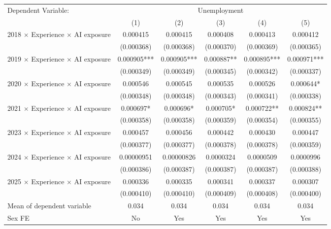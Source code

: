 \def\sym#1{\ifmmode^{#1}\else\(^{#1}\)\fi}
\begin{tabular}{l*{5}{c}}
\toprule
Dependent Variable: & \multicolumn{5}{c}{Unemployment} \\
\cmidrule(lr){2-6}
 & (1) & (2) & (3) & (4) & (5) \\
\midrule
2018 $\times$ Experience $\times$ AI exposure&    0.000415   &    0.000415   &    0.000408   &    0.000413   &    0.000412   \\
            &  (0.000368)   &  (0.000368)   &  (0.000370)   &  (0.000369)   &  (0.000365)   \\
2019 $\times$ Experience $\times$ AI exposure&    0.000905***&    0.000905***&    0.000887** &    0.000895***&    0.000971***\\
            &  (0.000349)   &  (0.000349)   &  (0.000345)   &  (0.000342)   &  (0.000337)   \\
2020 $\times$ Experience $\times$ AI exposure&    0.000546   &    0.000545   &    0.000535   &    0.000526   &    0.000644*  \\
            &  (0.000348)   &  (0.000348)   &  (0.000343)   &  (0.000341)   &  (0.000338)   \\
2021 $\times$ Experience $\times$ AI exposure&    0.000697*  &    0.000696*  &    0.000705*  &    0.000722** &    0.000824** \\
            &  (0.000358)   &  (0.000358)   &  (0.000359)   &  (0.000354)   &  (0.000355)   \\
2023 $\times$ Experience $\times$ AI exposure&    0.000457   &    0.000456   &    0.000442   &    0.000430   &    0.000447   \\
            &  (0.000377)   &  (0.000377)   &  (0.000378)   &  (0.000378)   &  (0.000359)   \\
2024 $\times$ Experience $\times$ AI exposure&  0.00000951   &  0.00000826   &   0.0000324   &   0.0000509   &   0.0000996   \\
            &  (0.000386)   &  (0.000387)   &  (0.000387)   &  (0.000387)   &  (0.000388)   \\
2025 $\times$ Experience $\times$ AI exposure&    0.000336   &    0.000335   &    0.000341   &    0.000337   &    0.000307   \\
            &  (0.000410)   &  (0.000410)   &  (0.000409)   &  (0.000408)   &  (0.000400)   \\
\midrule
Mean of dependent variable&       0.034   &       0.034   &       0.034   &       0.034   &       0.034   \\
Sex FE      &          No   &         Yes   &         Yes   &         Yes   &         Yes   \\

\end{tabular}
